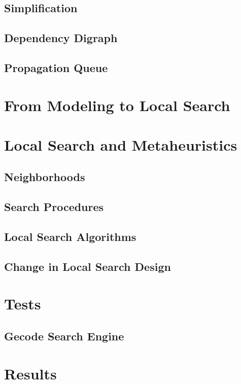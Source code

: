 \documentclass[a4paper,11pt]{article}
\begin{document}
  \subsection{Simplification}
  
  \subsection{Dependency Digraph}
     \label{sec_ddg}
  \subsection{Propagation Queue}  
    \label{sec_propaqueue}
    
  
\newpage  
\section{From Modeling to Local Search}

\newpage
\section{Local Search and Metaheuristics} \label{sec_local}
  
  \subsection{Neighborhoods}
  
  \subsection{Search Procedures}
  
  \subsection{Local Search Algorithms}
  
  \subsection{Change in Local Search Design}
  
  
\section{Tests}

\subsection{Gecode Search Engine}
%
\section{Results}
\end{document}
